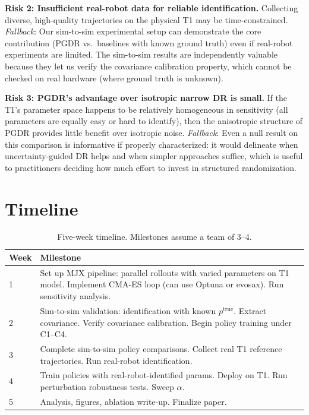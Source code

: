 \documentclass[10pt,twocolumn]{article}
\begin{document}
\textbf{Risk 2: Insufficient real-robot data for reliable identification.}
Collecting diverse, high-quality trajectories on the physical T1 may be time-constrained.
\emph{Fallback}: Our sim-to-sim experimental setup can demonstrate the core contribution (PGDR vs.\ baselines with known ground truth) even if real-robot experiments are limited.
The sim-to-sim results are independently valuable because they let us verify the covariance calibration property, which cannot be checked on real hardware (where ground truth is unknown).

\textbf{Risk 3: PGDR's advantage over isotropic narrow DR is small.}
If the T1's parameter space happens to be relatively homogeneous in sensitivity (all parameters are equally easy or hard to identify), then the anisotropic structure of PGDR provides little benefit over isotropic noise.
\emph{Fallback}: Even a null result on this comparison is informative if properly characterized: it would delineate when uncertainty-guided DR helps and when simpler approaches suffice, which is useful to practitioners deciding how much effort to invest in structured randomization.

\section{Timeline}

\begin{table}[h]
\centering
\caption{Five-week timeline.  Milestones assume a team of 3--4.}
\label{tab:timeline}
\begin{tabular}{lp{5.5cm}}
\hline
\textbf{Week} & \textbf{Milestone} \\
\hline
1 & Set up MJX pipeline: parallel rollouts with varied parameters on T1 model.  Implement CMA-ES loop (can use Optuna or evosax).  Run sensitivity analysis. \\
2 & Sim-to-sim validation: identification with known $p^{\mathrm{true}}$.  Extract covariance.  Verify covariance calibration.  Begin policy training under C1--C4. \\
3 & Complete sim-to-sim policy comparisons.  Collect real T1 reference trajectories.  Run real-robot identification. \\
4 & Train policies with real-robot-identified params.  Deploy on T1.  Run perturbation robustness tests.  Sweep $\alpha$. \\
5 & Analysis, figures, ablation write-up.  Finalize paper. \\
\hline
\end{tabular}
\end{table}
\end{document}
